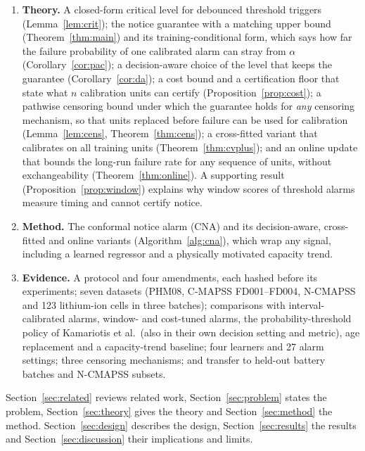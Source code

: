 \begin{enumerate}[leftmargin=1.4em,itemsep=2pt]
\item \textbf{Theory.} A closed-form critical level for debounced threshold triggers (Lemma~\ref{lem:crit}); the notice guarantee with a matching upper bound (Theorem~\ref{thm:main}) and its training-conditional form, which says how far the failure probability of one calibrated alarm can stray from $\alpha$ (Corollary~\ref{cor:pac}); a decision-aware choice of the level that keeps the guarantee (Corollary~\ref{cor:da}); a cost bound and a certification floor that state what $n$ calibration units can certify (Proposition~\ref{prop:cost}); a pathwise censoring bound under which the guarantee holds for \emph{any} censoring mechanism, so that units replaced before failure can be used for calibration (Lemma~\ref{lem:cens}, Theorem~\ref{thm:cens}); a cross-fitted variant that calibrates on all training units (Theorem~\ref{thm:cvplus}); and an online update that bounds the long-run failure rate for any sequence of units, without exchangeability (Theorem~\ref{thm:online}). A supporting result (Proposition~\ref{prop:window}) explains why window scores of threshold alarms measure timing and cannot certify notice.
\item \textbf{Method.} The conformal notice alarm (CNA) and its decision-aware, cross-fitted and online variants (Algorithm~\ref{alg:cna}), which wrap any signal, including a learned regressor and a physically motivated capacity trend.
\item \textbf{Evidence.} A protocol and four amendments, each hashed before its experiments; seven datasets (PHM08, C-MAPSS FD001--FD004, N-CMAPSS and 123 lithium-ion cells in three batches); comparisons with interval-calibrated alarms, window- and cost-tuned alarms, the probability-threshold policy of Kamariotis et al.\ (also in their own decision setting and metric), age replacement and a capacity-trend baseline; four learners and 27 alarm settings; three censoring mechanisms; and transfer to held-out battery batches and N-CMAPSS subsets.
\end{enumerate}



Section~\ref{sec:related} reviews related work, Section~\ref{sec:problem} states the problem, Section~\ref{sec:theory} gives the theory and Section~\ref{sec:method} the method. Section~\ref{sec:design} describes the design, Section~\ref{sec:results} the results and Section~\ref{sec:discussion} their implications and limits.
